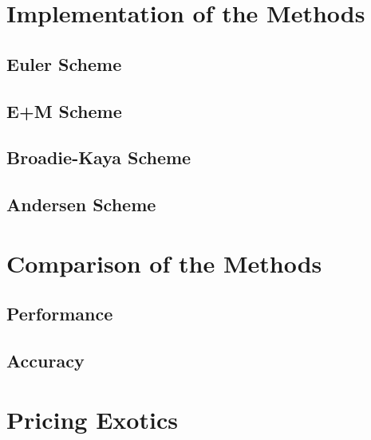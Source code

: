 \chapter{Implementation of the Methods}
    \section{Euler Scheme}

    \section{E+M Scheme}

    \section{Broadie-Kaya Scheme}

    \section{Andersen Scheme}

\chapter{Comparison of the Methods}
    \section{Performance}

    \section{Accuracy}

\chapter{Pricing Exotics}
